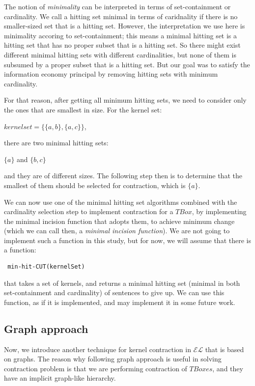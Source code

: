 \documentclass{sfuthesis}
\theoremstyle{plain}
\theoremstyle{definition}
\begin{document}
The notion of \textit{minimality} can be interpreted in terms of set-containment or cardinality. We call a hitting set minimal in terms of caridnality if there is no smaller-sized set that is a hitting set. However, the interpretation we use here is minimality accoring to set-containment; this means a minimal hitting set is a hitting set that has no proper subset that is a hitting set. So there might exist different minimal hitting sets with different cardinalities, but none of them is subsumed by a proper subset that is a hitting set\cite{hit}. But our goal was to satisfy the information economy principal by removing hitting sets with minimum cardinality. 

For that reason, after getting all minimum hitting sets, we need to consider only the ones that are smallest in size. For the kernel set:
\begin{center}
$kernelset = \lbrace \lbrace a, b \rbrace , \lbrace a, c \rbrace \rbrace$,
\end{center}
there are two minimal hitting sets:
\begin{center}
$\lbrace a \rbrace$ \hspace{1cm} and \hspace{1cm} $\lbrace b, c \rbrace$
\end{center}
and they are of different sizes. The following step then is to determine that the smallest of them should be selected for contraction, which is $\lbrace a \rbrace$.

We can now use one of the minimal hitting set algorithms combined with the cardinality selection step to implement contraction for a $TBox$, by implementing the minimal incision function that adopts them, to achieve minimum change (which we can call then, a \textit{minimal incision function}). We are not going to implement such a function in this study, but for now, we will assume that there is a function:
\begin{verbatim}
 min-hit-CUT(kernelSet)
\end{verbatim}
that takes a set of kernels, and returns a minimal hitting set (minimal in both set-containment and cardinality) of sentences to give up. We can use this function, as if it is implemented, and may implement it in some future work.

\subsection{Graph approach}
Now, we introduce another technique for kernel contraction in $\mathcal{EL}$ that is based on graphs. The reason why following graph approach is useful in solving contraction problem is that we are performing contraction of $TBoxes$, and they have an implicit graph-like hierarchy. 
\end{document}
